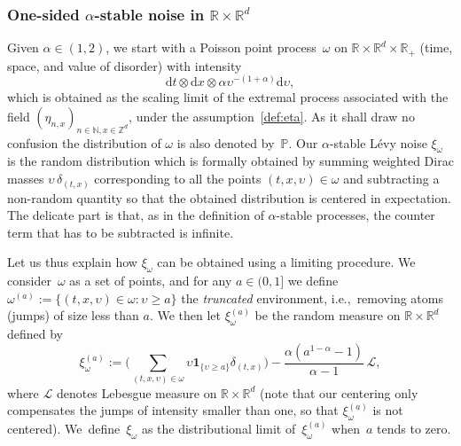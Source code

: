 \documentclass[11pt]{article}
\newcommand{\ie}{i.e.,\xspace}
\numberwithin{equation}{section}
\let\mathcal\mathscr
\let\sep:
\theoremstyle{definition}
\newcommand{\dd}{\mathrm{d}}
\newcommand{\ind}{\mathbf{1}}
\newcommand{\cL}{{\ensuremath{\mathcal L}} }
\newcommand{\bbN}{{\ensuremath{\mathbb N}} }
\newcommand{\bbP}{{\ensuremath{\mathbb P}} }
\newcommand{\bbR}{{\ensuremath{\mathbb R}} }
\newcommand{\bbZ}{{\ensuremath{\mathbb Z}} }
\let\ups\upsilon
\let\go\omega
\begin{document}
\subsubsection*{One-sided $\alpha$-stable noise in $\bbR\times \bbR^d$}
Given $\alpha\in(1,2)$, we start with a Poisson
point process~$\go$ on $\bbR\times \bbR^d\times \bbR_+$ (time, space, and value of disorder) with intensity
\begin{equation}
\label{Poissondens}
\dd t \otimes \dd x \otimes \alpha \ups^{-(1+\alpha)} \dd \ups,
\end{equation}
which is obtained as the scaling limit of the extremal process associated with the field $(\eta_{n,x})_{n \in \bbN, x\in \bbZ^d}$, under the assumption~\eqref{def:eta}.
As it shall draw no confusion the distribution of $\go$ is also denoted by~$\bbP$.
Our $\alpha$-stable Lévy noise $\xi_{\go}$ is the random distribution which is formally obtained by summing weighted Dirac masses $\ups\,\delta_{(t,x)}$ corresponding to all the points $(t,x,\ups)\in \go$ and subtracting a non-random quantity so that the obtained distribution is centered in expectation. The delicate part is that, as in the definition of $\alpha$-stable processes, the counter term that has to be subtracted is infinite.

Let us thus explain how $\xi_{\go}$ can be obtained using a limiting procedure.
We consider~$\go$ as a set of points, and for any $a\in(0,1]$ we define $\go^{(a)}:=\{ (t,x,\ups)\in \go \sep \ups\ge a\}$ the \emph{truncated} environment, \ie \ removing atoms (jumps) of size less than $a$.
We then let $\xi_{\go}^{(a)}$ be the random measure on $\bbR\times \bbR^d$ defined by
\begin{equation}
\label{def:omegabar}
\xi_{\go}^{(a)}:= \bigg(\sum_{(t,x,\ups)\in \go} \ups\ind_{\{\ups \ge a\}} \delta_{(t,x)} \bigg)- \frac{ \alpha (a^{1-\alpha}-1)}{\alpha-1} \, \cL,
\end{equation}
where $\cL$ denotes Lebesgue measure on $\bbR\times \bbR^d$
(note that our centering only compensates the jumps of intensity smaller than one, so that $\xi_{\go}^{(a)}$ is
not centered).
We~de\-fine~$\xi_{\go}$ as the distributional limit of~$ \xi_{\go}^{(a)}$ when~$a$ tends to zero.
\end{document}
